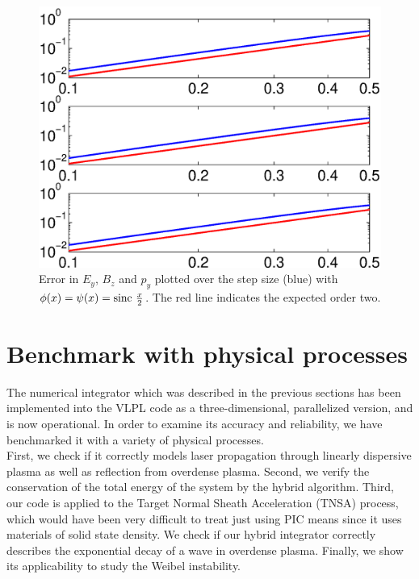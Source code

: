 \documentclass[conference]{IEEEtran}
\newcommand{\sinc}{\textnormal{sinc}}
\renewcommand{\~}{\widetilde }
\begin{document}
\begin{figure}[H]
 \begin{center}
 \includegraphics[width=1.0\columnwidth,keepaspectratio]{err_n8_dx5_110160_3_with_2f.eps}
\end{center}
\caption{Error in $E_y$, $B_z$ and $p_y$ plotted over the step size (blue) with
$\phi(x)=\psi(x)=\sinc~\frac{x}{2}$. The red line indicates the expected order
two.}
\label{fig:2filter}
\end{figure}


\section{Benchmark with physical processes}\label{sec:tests}

The numerical integrator which was described in the previous sections has been implemented into the VLPL code as a three-dimensional, parallelized version, and is now
operational. In order to examine its accuracy and reliability, we have benchmarked it with a variety of physical processes. \\
First, we check if it correctly models laser propagation through
linearly dispersive plasma as well as reflection from overdense
plasma. Second, we verify the conservation of the total energy of the
system by the hybrid algorithm. Third, our code is applied to the
Target Normal Sheath Acceleration (TNSA) process, which would have
been very difficult to treat just using PIC means since it uses
materials of solid state density. We check if our hybrid integrator
correctly describes the exponential decay of a wave in overdense
plasma. Finally, we show its applicability to study the
Weibel instability. \\ 
\end{document}
